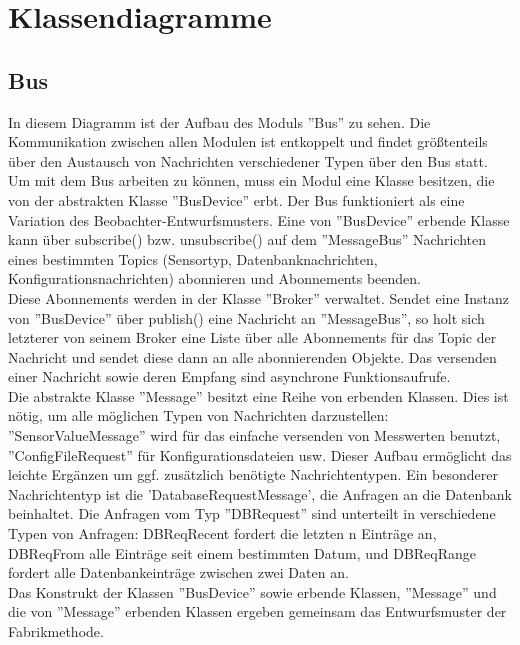 \documentclass[entwurf.tex]{subfiles}
\begin{document}
\chapter{Klassendiagramme}
	\section{Bus}
		
  		In diesem Diagramm ist der Aufbau des Moduls ''Bus'' zu sehen. Die Kommunikation zwischen allen Modulen ist entkoppelt und findet größtenteils über den Austausch von Nachrichten verschiedener Typen über den Bus statt. Um mit dem Bus arbeiten zu können, muss ein Modul eine Klasse besitzen, die von der abstrakten Klasse ''BusDevice'' erbt. Der Bus funktioniert als eine Variation des Beobachter-Entwurfsmusters. Eine von ''BusDevice'' erbende Klasse kann über subscribe() bzw. unsubscribe() auf dem ''MessageBus'' Nachrichten eines bestimmten Topics (Sensortyp, Datenbanknachrichten, Konfigurationsnachrichten) abonnieren und Abonnements beenden. \\
  		Diese Abonnements werden in der Klasse ''Broker'' verwaltet. Sendet eine Instanz von ''BusDevice'' über publish() eine Nachricht an ''MessageBus'', so holt sich letzterer von seinem Broker eine Liste über alle Abonnements für das Topic der Nachricht und sendet diese dann an alle abonnierenden Objekte. Das versenden einer Nachricht sowie deren Empfang sind asynchrone Funktionsaufrufe. \\
  		Die abstrakte Klasse ''Message'' besitzt eine Reihe von erbenden Klassen. Dies ist nötig, um alle möglichen Typen von Nachrichten darzustellen: ''SensorValueMessage'' wird für das einfache versenden von Messwerten benutzt, ''ConfigFileRequest'' für Konfigurationsdateien usw. Dieser Aufbau ermöglicht das leichte Ergänzen um ggf. zusätzlich benötigte Nachrichtentypen. Ein besonderer Nachrichtentyp ist die 'DatabaseRequestMessage', die Anfragen an die Datenbank beinhaltet. Die Anfragen vom Typ ''DBRequest'' sind unterteilt in verschiedene Typen von Anfragen: DBReqRecent fordert die letzten n Einträge an, DBReqFrom alle Einträge seit einem bestimmten Datum, und DBReqRange fordert alle Datenbankeinträge zwischen zwei Daten an. \\
  		Das Konstrukt der Klassen ''BusDevice'' sowie erbende Klassen, ''Message'' und die von ''Message'' erbenden Klassen ergeben gemeinsam das Entwurfsmuster der Fabrikmethode.
  		
\end{document}
